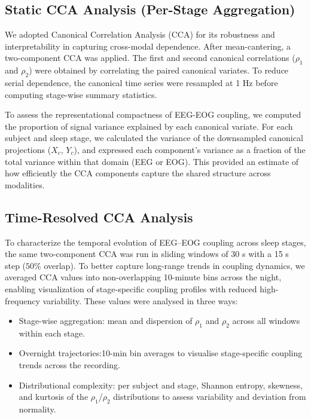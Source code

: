 \subsection{Static CCA Analysis (Per-Stage Aggregation)}

We adopted Canonical Correlation Analysis (CCA) for its robustness and interpretability in capturing cross-modal dependence. After mean-cantering, a two-component CCA was applied. The first and second canonical correlations ($\rho_1$ and $\rho_2$) were obtained by correlating the paired canonical variates. To reduce serial dependence, the canonical time series were resampled at 1 Hz before computing stage-wise summary statistics.

To assess the representational compactness of EEG-EOG coupling, we computed the proportion of signal variance explained by each canonical variate. For each subject and sleep stage, we calculated the variance of the downsampled canonical projections ($X_c$, $Y_c$), and expressed each component's variance as a fraction of the total variance within that domain (EEG or EOG). This provided an estimate of how efficiently the CCA components capture the shared structure across modalities.

\subsection{Time-Resolved CCA Analysis}

To characterize the temporal evolution of EEG–EOG coupling across sleep stages, the same two-component CCA was run in sliding windows of 30 s with a 15 s step ($50\%$ overlap). To better capture long-range trends in coupling dynamics, we averaged CCA values into non-overlapping 10-minute bins across the night, enabling visualization of stage-specific coupling profiles with reduced high-frequency variability.
These values were analysed in three ways:
\begin{itemize}
    \item Stage-wise aggregation: mean and dispersion of $\rho_1$ and $\rho_2$ across all windows within each stage.
    \item Overnight trajectories:10-min bin averages to visualise stage-specific coupling trends across the recording.
    \item Distributional complexity: per subject and stage, Shannon entropy, skewness, and kurtosis of the $\rho_1$/$\rho_2$ distributions to assess variability and deviation from normality.
\end{itemize}

